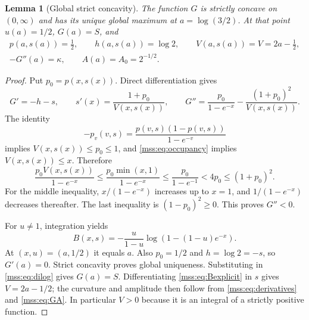 \documentclass[11pt,letterpaper]{article}
\numberwithin{equation}{section}
\newtheorem{lemma}[theorem]{Lemma}
\theoremstyle{definition}\newtheorem{definition}[theorem]{Definition}
\theoremstyle{remark}\newtheorem{remark}[theorem]{Remark}
\begin{document}
\begin{lemma}[Global strict concavity]\label{mss:lem:concavity}
The function $G$ is strictly concave on $(0,\infty)$ and has its unique global maximum at $a=\log(3/2)$. At that point $u(a)=1/2$, $G(a)=S$, and
\begin{equation}\label{mss:eq:saddlevalues}
\begin{gathered}
p(a,s(a))=\tfrac12,\qquad h(a,s(a))=\log2,\qquad
V(a,s(a))=V=2a-\tfrac12,\\
-G''(a)=\kappa,\qquad A(a)=A_0=2^{-1/2}.
\end{gathered}
\end{equation}
\end{lemma}
\begin{proof}
Put $p_0=p(x,s(x))$. Direct differentiation gives
\begin{equation}\label{mss:eq:derivatives}
G'=-h-s,\qquad
s'(x)=\frac{1+p_0}{V(x,s(x))},\qquad
G''=\frac{p_0}{1-e^{-x}}-\frac{(1+p_0)^2}{V(x,s(x))}.
\end{equation}
The identity
\begin{equation}\label{mss:eq:pv}
-p_v(v,s)=\frac{p(v,s)(1-p(v,s))}{1-e^{-v}}
\end{equation}
implies $V(x,s(x))\le p_0\le1$, and \eqref{mss:eq:occupancy} implies $V(x,s(x))\le x$. Therefore
\begin{equation}\label{mss:eq:concavityineq}
\frac{p_0V(x,s(x))}{1-e^{-x}}
\le\frac{p_0\min(x,1)}{1-e^{-x}}
\le\frac{p_0}{1-e^{-1}}<4p_0\le(1+p_0)^2.
\end{equation}
For the middle inequality, $x/(1-e^{-x})$ increases up to $x=1$, and $1/(1-e^{-x})$ decreases thereafter. The last inequality is $(1-p_0)^2\ge0$. This proves $G''<0$.

For $u\ne1$, integration yields
\begin{equation}\label{mss:eq:Bexplicit}
B(x,s)=-\frac{u}{1-u}\log(1-(1-u)e^{-x}).
\end{equation}
At $(x,u)=(a,1/2)$ it equals $a$. Also $p_0=1/2$ and $h=\log2=-s$, so $G'(a)=0$. Strict concavity proves global uniqueness. Substituting in \eqref{mss:eq:dilog} gives $G(a)=S$. Differentiating \eqref{mss:eq:Bexplicit} in $s$ gives $V=2a-1/2$; the curvature and amplitude then follow from \eqref{mss:eq:derivatives} and \eqref{mss:eq:GA}. In particular $V>0$ because it is an integral of a strictly positive function.
\end{proof}
\end{document}
